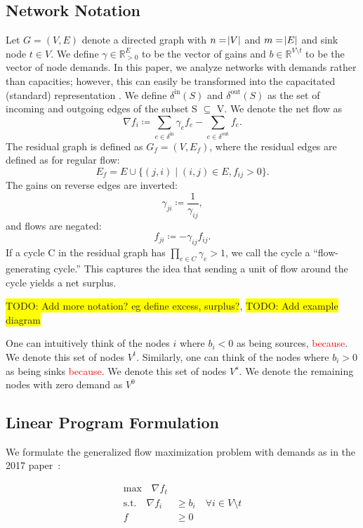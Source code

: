 \documentclass[11pt]{article}
\theoremstyle{definition}
\theoremstyle{definition}
\newcommand{\R}{\mathbb{R}}
\newcommand{\nfi}{\nabla f_i}
\newcommand{\din}{\delta^{\text{in}}}
\newcommand{\dout}{\delta^{\text{out}}}
\newcommand{\vsrc}{V^{t}}
\newcommand{\vsink}{V^{s}}
\newcommand{\vz}{V^{0}}
\newcommand{\rewrite}[1]{\textcolor{red}{#1}}
\newcommand{\todo}[1]{\colorbox{yellow}{TODO: #1}}
\begin{document}
	\subsection{Network Notation}
    Let $G=(V,E)$ denote a directed graph with $n=\abs{V}$ and $m=\abs{E}$ and sink node $t \in V$. We define $\gamma \in \R_{>0}^E$ to be the vector of gains and $b \in \R^{V \setminus t}$ to be the vector of node demands. In this paper, we analyze networks with demands rather than capacities; however, this can easily be transformed into the capacitated (standard) representation \cite{Vegh2013}. We define $\din(S)$ and $\dout(S)$ as the set of incoming and outgoing edges of the subset S $\subseteq$ V. We denote the net flow as
    \[ \nfi \coloneqq \sum_{e \in \din} \gamma_e f_e - \sum_{e \in \dout} f_e.\]
    The residual graph is defined as $G_f = (V, E_f)$, where the residual edges are defined
    as for regular flow:
    \[ E_f = E \cup \{ (j, i) \mid (i, j) \in E, f_{ij} > 0 \}. \]
    The gains on reverse edges are inverted:
    \[ \gamma_{ji} \coloneqq \frac{1}{\gamma_{ij}}, \]
    and flows are negated:
    \[ f_{ji} \coloneqq -\gamma_{ij}f_{ij}. \]
    If a cycle C in the residual graph has $\prod_{e \in C} \gamma_e > 1$,
    we call the cycle a ``flow-generating cycle.'' This captures the idea that sending
    a unit of flow around the cycle yields a net surplus.
    
\todo{Add more notation? eg define excess, surplus?}, \todo{Add example diagram}

One can intuitively think of the nodes $i$ where $b_i < 0$ as being sources, \rewrite{because}. We denote this set of nodes $\vsrc$. Similarly, one can think of the nodes where $b_i > 0$ as being sinks \rewrite{because}. We denote this set of nodes $\vsink$. We denote the remaining nodes with zero demand as $\vz$
    
    \subsection{Linear Program Formulation}
    \label{sec:lp}

	We formulate the generalized flow maximization problem with demands as in the 2017 paper~\cite{Olver2017}:
    
        \begin{align*}\tag{P}
        \text{max} \quad
        \nabla f_t& \\
        \text{s.t.} \quad
        \nabla f_i &\geq b_i \quad \forall i \in V \setminus t \\
        f &\geq 0
        \end{align*}        
\end{document}
